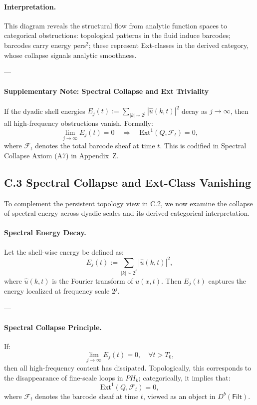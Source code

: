 \documentclass[11pt]{article}
\begin{document}
\paragraph{Interpretation.}
This diagram reveals the structural flow from analytic function spaces to categorical obstructions:  
topological patterns in the fluid induce barcodes; barcodes carry energy \( \text{pers}^2 \);  
these represent Ext-classes in the derived category, whose collapse signals analytic smoothness.

---

\paragraph{Supplementary Note: Spectral Collapse and Ext Triviality}

If the dyadic shell energies \( E_j(t) := \sum_{|k| \sim 2^j} |\widehat{u}(k,t)|^2 \) decay as \( j \to \infty \),  
then all high-frequency obstructions vanish. Formally:
\[
\lim_{j \to \infty} E_j(t) = 0 
\quad \Rightarrow \quad 
\mathrm{Ext}^1(Q, \mathcal{F}_t) = 0,
\]
where \( \mathcal{F}_t \) denotes the total barcode sheaf at time \( t \).  
This is codified in Spectral Collapse Axiom (A7) in Appendix~Z.



\subsection*{C.3 Spectral Collapse and Ext-Class Vanishing}

To complement the persistent topology view in C.2, we now examine the collapse of spectral energy across dyadic scales and its derived categorical interpretation.

\paragraph{Spectral Energy Decay.}
Let the shell-wise energy be defined as:
\[
E_j(t) := \sum_{|k| \sim 2^j} |\widehat{u}(k,t)|^2,
\]
where \( \widehat{u}(k,t) \) is the Fourier transform of \( u(x,t) \).  
Then \( E_j(t) \) captures the energy localized at frequency scale \( 2^j \).  

---

\paragraph{Spectral Collapse Principle.}
If:
\[
\lim_{j \to \infty} E_j(t) = 0, \quad \forall t > T_0,
\]
then all high-frequency content has dissipated.  
Topologically, this corresponds to the disappearance of fine-scale loops in \( PH_k \);  
categorically, it implies that:
\[
\mathrm{Ext}^1(Q, \mathcal{F}_t) = 0,
\]
where \( \mathcal{F}_t \) denotes the barcode sheaf at time \( t \), viewed as an object in \( D^b(\mathsf{Filt}) \).
\end{document}
